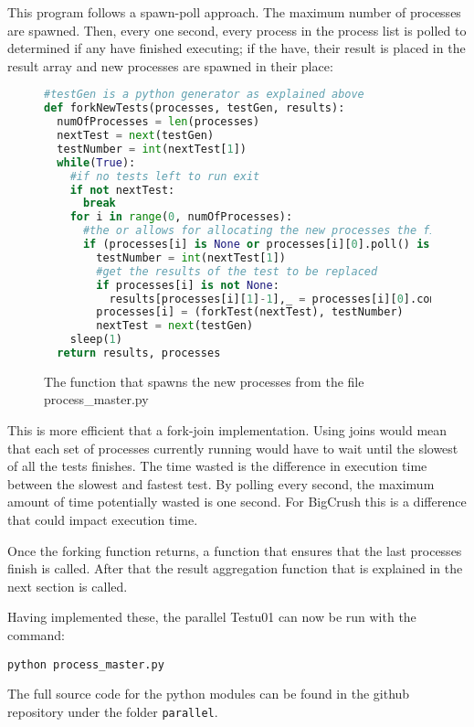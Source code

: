 This program follows a spawn-poll approach. The maximum number of processes are spawned. Then, every one second, every process in the process list is polled to determined if any have finished executing; if the have, their result is placed in the result array and new processes are spawned in their place:

\begin{figure}[h]
\begin{lstlisting}[language=Python]
#testGen is a python generator as explained above
def forkNewTests(processes, testGen, results):
  numOfProcesses = len(processes)
  nextTest = next(testGen)
  testNumber = int(nextTest[1])
  while(True):
    #if no tests left to run exit
    if not nextTest:
      break
    for i in range(0, numOfProcesses):
      #the or allows for allocating the new processes the first time this code is executed
      if (processes[i] is None or processes[i][0].poll() is not None) and nextTest:
        testNumber = int(nextTest[1])
        #get the results of the test to be replaced
        if processes[i] is not None:
          results[processes[i][1]-1],_ = processes[i][0].communicate()
        processes[i] = (forkTest(nextTest), testNumber)
        nextTest = next(testGen)
    sleep(1)
  return results, processes
\end{lstlisting}
\caption{The function that spawns the new processes from the file process\_master.py}
\label{fig:forkNewTests}
\end{figure}

This is more efficient that a fork-join implementation. Using joins would mean that each set of processes currently running would have to wait until the slowest of all the tests finishes. The time wasted is the difference in execution time between the slowest and fastest test. By polling every second, the maximum amount of time potentially wasted is one second. For BigCrush this is a difference that could impact execution time.

Once the forking function returns, a function that ensures that the last processes finish is called. After that the result aggregation function that is explained in the next section is called.

Having implemented these, the parallel Testu01 can now be run with the command:

\begin{verbatim}
python process_master.py
\end{verbatim}

The full source code for the python modules can be found in the github repository\cite{github-repo} under the folder \texttt{parallel}.

